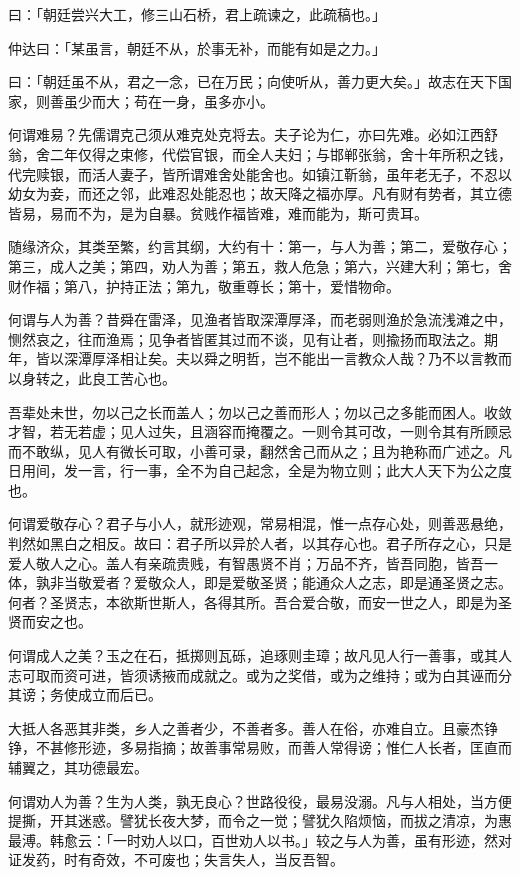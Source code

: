 \documentclass[letterpaper,10pt,english]{sphinxmanual}
\begin{document}
曰：「朝廷尝兴大工，修三山石桥，君上疏谏之，此疏稿也。」

仲达曰：「某虽言，朝廷不从，於事无补，而能有如是之力。」

曰：「朝廷虽不从，君之一念，已在万民；向使听从，善力更大矣。」故志在天下国家，则善虽少而大；苟在一身，虽多亦小。

何谓难易？先儒谓克己须从难克处克将去。夫子论为仁，亦曰先难。必如江西舒翁，舍二年仅得之束修，代偿官银，而全人夫妇；与邯郸张翁，舍十年所积之钱，代完赎银，而活人妻子，皆所谓难舍处能舍也。如镇江靳翁，虽年老无子，不忍以幼女为妾，而还之邻，此难忍处能忍也；故天降之福亦厚。凡有财有势者，其立德皆易，易而不为，是为自暴。贫贱作福皆难，难而能为，斯可贵耳。

随缘济众，其类至繁，约言其纲，大约有十：第一，与人为善；第二，爱敬存心；第三，成人之美；第四，劝人为善；第五，救人危急；第六，兴建大利；第七，舍财作福；第八，护持正法；第九，敬重尊长；第十，爱惜物命。

何谓与人为善？昔舜在雷泽，见渔者皆取深潭厚泽，而老弱则渔於急流浅滩之中，恻然哀之，往而渔焉；见争者皆匿其过而不谈，见有让者，则揄扬而取法之。期年，皆以深潭厚泽相让矣。夫以舜之明哲，岂不能出一言教众人哉？乃不以言教而以身转之，此良工苦心也。

吾辈处未世，勿以己之长而盖人；勿以己之善而形人；勿以己之多能而困人。收敛才智，若无若虚；见人过失，且涵容而掩覆之。一则令其可改，一则令其有所顾忌而不敢纵，见人有微长可取，小善可录，翻然舍己而从之；且为艳称而广述之。凡日用间，发一言，行一事，全不为自己起念，全是为物立则；此大人天下为公之度也。

何谓爱敬存心？君子与小人，就形迹观，常易相混，惟一点存心处，则善恶悬绝，判然如黑白之相反。故曰：君子所以异於人者，以其存心也。君子所存之心，只是爱人敬人之心。盖人有亲疏贵贱，有智愚贤不肖；万品不齐，皆吾同胞，皆吾一体，孰非当敬爱者？爱敬众人，即是爱敬圣贤；能通众人之志，即是通圣贤之志。何者？圣贤志，本欲斯世斯人，各得其所。吾合爱合敬，而安一世之人，即是为圣贤而安之也。

何谓成人之美？玉之在石，抵掷则瓦砾，追琢则圭璋；故凡见人行一善事，或其人志可取而资可进，皆须诱掖而成就之。或为之奖借，或为之维持；或为白其诬而分其谤；务使成立而后已。

大抵人各恶其非类，乡人之善者少，不善者多。善人在俗，亦难自立。且豪杰铮铮，不甚修形迹，多易指摘；故善事常易败，而善人常得谤；惟仁人长者，匡直而辅翼之，其功德最宏。

何谓劝人为善？生为人类，孰无良心？世路役役，最易没溺。凡与人相处，当方便提撕，开其迷惑。譬犹长夜大梦，而令之一觉；譬犹久陷烦恼，而拔之清凉，为惠最溥。韩愈云：「一时劝人以口，百世劝人以书。」较之与人为善，虽有形迹，然对证发药，时有奇效，不可废也；失言失人，当反吾智。
\end{document}
